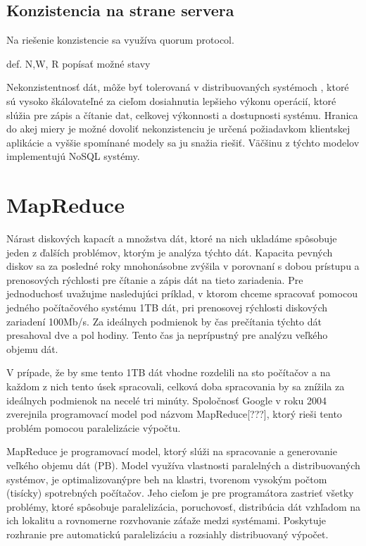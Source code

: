 \documentclass[11pt,twoside,a4paper]{book}
\begin{document}
\subsection{Konzistencia na strane servera}

Na riešenie konzistencie sa využíva quorum protocol.

def. N,W, R popísať možné stavy



Nekonzistentnosť dát, môže byť tolerovaná v distribuovaných systémoch , ktoré sú vysoko škálovateľné za cieľom dosiahnutia lepšieho výkonu operácií, ktoré slúžia pre zápis a čítanie dat, celkovej výkonnosti a dostupnosti systému. Hranica do akej miery je možné dovoliť nekonzistenciu je určená požiadavkom klientskej aplikácie a vyššie spomínané modely sa ju snažia riešiť. Väčšinu z týchto modelov implementujú NoSQL systémy.


\section{MapReduce}

Nárast diskových kapacít a množstva dát, ktoré na nich ukladáme spôsobuje jeden z ďalších problémov, ktorým je analýza týchto dát. Kapacita pevných diskov sa za posledné roky mnohonásobne zvýšila v porovnaní s dobou prístupu a prenosových rýchlosti pre čítanie a zápis dát na tieto zariadenia. Pre jednoduchosť uvažujme nasledujúci príklad, v ktorom chceme spracovať pomocou jedného počítačového systému 1TB dát, pri prenosovej rýchlosti diskových zariadení 100Mb/s. Za ideálnych podmienok by čas prečítania týchto dát presahoval dve a pol hodiny. Tento čas ja neprípustný pre analýzu veľkého objemu dát.

V prípade, že by sme tento 1TB dát vhodne rozdelili na sto počítačov a na každom z nich tento úsek spracovali, celková doba spracovania by sa znížila za ideálnych podmienok na necelé tri minúty. Spoločnosť Google v roku 2004 zverejnila programovací model pod názvom MapReduce[???], ktorý rieši tento problém pomocou paralelizácie výpočtu.

MapReduce je programovací model, ktorý slúži na spracovanie a generovanie veľkého objemu dát (PB). Model využíva vlastnosti paralelných a distribuovaných systémov, je optimalizovanýpre beh na klastri, tvorenom vysokým počtom (tisícky) spotrebných počítačov. Jeho cieľom je pre programátora zastrieť všetky problémy, ktoré spôsobuje paralelizácia, poruchovosť, distribúcia dát vzhľadom na ich lokalitu a rovnomerne rozvhovanie záťaže medzi systémami. Poskytuje rozhranie pre automatickú paralelizáciu a rozsiahly distribuovaný výpočet.
\end{document}
